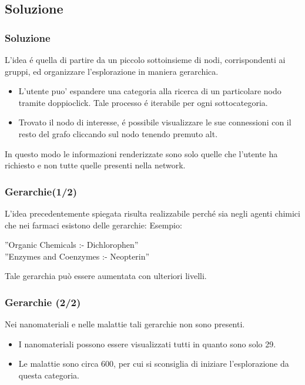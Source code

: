 \documentclass{beamer}
\begin{document}
\subsection{Soluzione}
\begin{frame}
\frametitle{Soluzione}
L'idea \'e quella di partire da un piccolo sottoinsieme di nodi, corrispondenti ai gruppi, ed organizzare l'esplorazione in maniera gerarchica. 
\begin{itemize}
\item L'utente puo' espandere una categoria alla ricerca di un particolare nodo tramite doppioclick. Tale processo \'e iterabile per ogni sottocategoria.
\item Trovato il nodo di interesse, \'e possibile visualizzare le sue connessioni con il resto del grafo cliccando sul nodo tenendo premuto alt.
\end{itemize}
\medskip
In questo modo le informazioni renderizzate sono solo quelle che l'utente ha richiesto e non tutte quelle presenti nella network. 
\end{frame}

\begin{frame}
\frametitle{Gerarchie(1/2)}
L'idea precedentemente spiegata risulta realizzabile perché sia negli agenti chimici che nei farmaci esistono delle gerarchie: Esempio:\\
\medskip
\begin{center}
''Organic Chemicals :- Dichlorophen''\\
''Enzymes and Coenzymes :- Neopterin''
\end{center}
Tale gerarchia può essere aumentata con ulteriori livelli. 
\end{frame}

\begin{frame}
\frametitle{Gerarchie (2/2)}
Nei nanomateriali e nelle malattie tali gerarchie non sono presenti.
\begin{itemize}
\item I nanomateriali possono essere visualizzati tutti in quanto sono solo 29.
\item Le malattie sono circa 600, per cui si sconsiglia di iniziare l'esplorazione da questa categoria.
\end{itemize}
\medskip
\end{frame}
\end{document}
